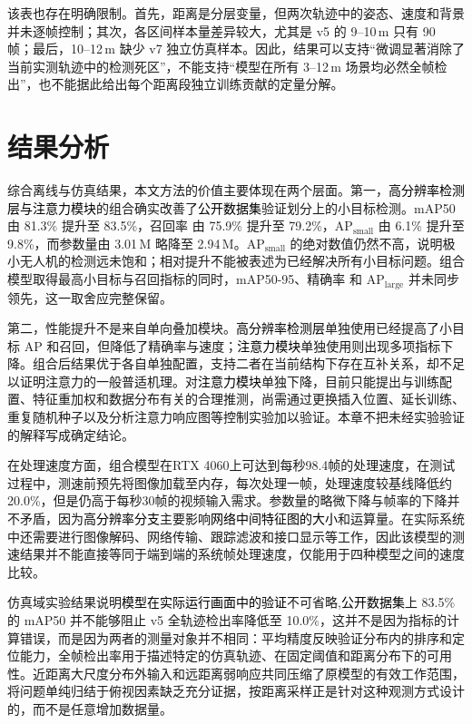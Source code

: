 该表也存在明确限制。首先，距离是分层变量，但两次轨迹中的姿态、速度和背景并未逐帧控制；其次，各区间样本量差异较大，尤其是 v5 的 9--10\,m 只有 90 帧；最后，10--12\,m 缺少 v7 独立仿真样本。因此，结果可以支持“微调显著消除了当前实测轨迹中的检测死区”，不能支持“模型在所有 3--12\,m 场景均必然全帧检出”，也不能据此给出每个距离段独立训练贡献的定量分解。

\section{结果分析}
\label{sec:ch5_discussion}

综合离线与仿真结果，本文方法的价值主要体现在两个层面。第一，\textcolor{black}{高分辨率检测层与注意力模块}的组合确实改善了\textcolor{black}{公开数据集}验证划分上的小目标检测。mAP50 由 81.3\% 提升至 83.5\%，召回率 由 75.9\% 提升至 79.2\%，AP$_{\mathrm{small}}$ 由 6.1\% 提升至 9.8\%，而参数量由 3.01\,M 略降至 2.94\,M。AP$_{\mathrm{small}}$ 的绝对数值仍然不高，说明极小无人机的检测远未饱和；相对提升不能被表述为已经解决所有小目标问题。组合模型取得最高小目标与召回指标的同时，mAP50-95、精确率 和 AP$_{\mathrm{large}}$ 并未同步领先，这一取舍应完整保留。

第二，性能提升不是来自单向叠加模块。\textcolor{black}{高分辨率检测层}单独使用已经提高了小目标 AP 和召回，但降低了精确率与速度；\textcolor{black}{注意力模块}单独使用则出现多项指标下降。组合后结果优于各自单独配置，支持二者在当前结构下存在互补关系，却不足以证明注意力的一般普适机理。对\textcolor{black}{注意力模块}单独下降，目前只能提出与训练配置、特征重加权和数据分布有关的合理推测，尚需通过更换插入位置、延长训练、重复随机种子以及分析注意力响应图等控制实验加以验证。本章不把未经实验验证的解释写成确定结论。

在处理速度方面，组合模型在RTX 4060上可达到每秒98.4帧的处理速度，在测试过程中，测速前预先将图像加载至内存，每次处理一帧，处理速度较基线降低约20.0\%，但是仍高于每秒30帧的视频输入需求。参数量的略微下降与帧率的下降并不矛盾，因为\textcolor{black}{高分辨率分支}主要影响\textcolor{black}{网络中间特征图的大小}和运算量。在实际系统中还需要进行图像解码、网络传输、跟踪滤波和接口显示等工作，因此该模型的测速结果并不能直接等同于端到端的系统帧处理速度，仅能用于四种模型之间的速度比较。

仿真域实验结果说明\textcolor{black}{模型在实际运行画面中的验证}不可省略,\textcolor{black}{公开数据集}上 83.5\% 的 mAP50 并不能够阻止 v5 全轨迹检出率降低至 10.0\%，这并不是因为指标的计算错误，而是因为两者的测量对象并不相同：平均精度反映验证分布内的排序和定位能力，全帧检出率用于描述特定的仿真轨迹、在固定阈值和距离分布下的可用性。近距离大尺度分布外输入和远距离弱响应共同压缩了原模型的有效工作范围，将问题单纯归结于俯视因素缺乏充分证据，按距离采样正是针对这种观测方式设计的，而不是任意增加数据量。

